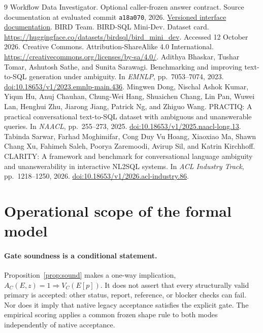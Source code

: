 \documentclass{article}
\newcommand{\code}[1]{\texttt{#1}}
\begin{document}
\begin{thebibliography}{9}
 Workflow Data Investigator. Optional caller-frozen answer contract. Source documentation at evaluated commit \code{a18a070}, 2026. \href{https://github.com/CamusFSY/workflow-data-investigator/blob/a18a07061ea7b9a3e1950b4527e36e266d17b487/data-investigation-agent/docs/evidence-roles.md}{Versioned interface documentation}.
 BIRD Team. BIRD-SQL Mini-Dev. Dataset card. \url{https://huggingface.co/datasets/birdsql/bird_mini_dev}. Accessed 12 October 2026.
 Creative Commons. Attribution-ShareAlike 4.0 International. \url{https://creativecommons.org/licenses/by-sa/4.0/}.
 Adithya Bhaskar, Tushar Tomar, Ashutosh Sathe, and Sunita Sarawagi. Benchmarking and improving text-to-SQL generation under ambiguity. In \emph{EMNLP}, pp.\ 7053--7074, 2023. \href{https://aclanthology.org/2023.emnlp-main.436/}{doi:10.18653/v1/2023.emnlp-main.436}.
 Mingwen Dong, Nischal Ashok Kumar, Yiqun Hu, Anuj Chauhan, Chung-Wei Hang, Shuaichen Chang, Lin Pan, Wuwei Lan, Henghui Zhu, Jiarong Jiang, Patrick Ng, and Zhiguo Wang. PRACTIQ: A practical conversational text-to-SQL dataset with ambiguous and unanswerable queries. In \emph{NAACL}, pp.\ 255--273, 2025. \href{https://aclanthology.org/2025.naacl-long.13/}{doi:10.18653/v1/2025.naacl-long.13}.
 Tabinda Sarwar, Farhad Moghimifar, Cong Duy Vu Hoang, Xiaoxiao Ma, Shawn Chang Xu, Fahimeh Saleh, Poorya Zaremoodi, Avirup Sil, and Katrin Kirchhoff. CLARITY: A framework and benchmark for conversational language ambiguity and unanswerability in interactive NL2SQL systems. In \emph{ACL Industry Track}, pp.\ 1218--1250, 2026. \href{https://aclanthology.org/2026.acl-industry.86/}{doi:10.18653/v1/2026.acl-industry.86}.
\end{thebibliography}

\clearpage
\appendix
\section{Operational scope of the formal model}
\label{app:formal}
\paragraph{Gate soundness is a conditional statement.} Proposition~\ref{prop:sound} makes a one-way implication, $A_C(E,z)=1\Rightarrow V_C(E[p])$. It does not assert that every structurally valid primary is accepted: other status, report, reference, or blocker checks can fail. Nor does it imply that native legacy acceptance satisfies the explicit gate. The empirical scoring applies a common frozen shape rule to both modes independently of native acceptance.
\end{document}
